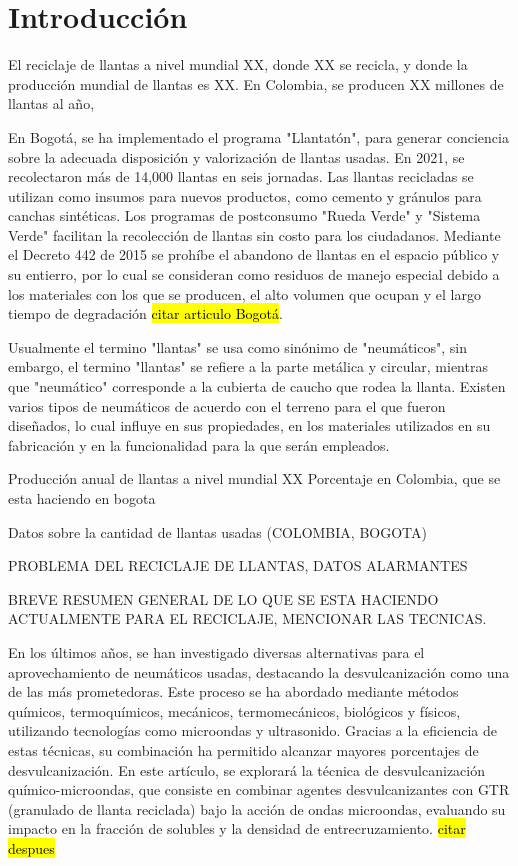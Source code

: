 \chapter{Introducción}


El reciclaje de llantas a nivel mundial XX, donde XX se recicla, y donde la producción mundial de llantas es XX. En Colombia, se producen XX millones de llantas al año, 

En Bogotá, se ha implementado el programa "Llantatón", para generar conciencia sobre la adecuada disposición y valorización de llantas usadas. En 2021, se recolectaron más de 14,000 llantas en seis jornadas. Las llantas recicladas se utilizan como insumos para nuevos productos, como cemento y gránulos para canchas sintéticas. Los programas de postconsumo "Rueda Verde" y "Sistema Verde" facilitan la recolección de llantas sin costo para los ciudadanos. Mediante el Decreto 442 de 2015 se prohíbe el abandono de llantas en el espacio público y su entierro, por lo cual se consideran como residuos de manejo especial debido a los materiales con los que se producen, el alto volumen que ocupan y el largo tiempo de degradación \hl{citar articulo Bogotá}.

Usualmente el termino "llantas" se usa como sinónimo de "neumáticos", sin embargo, el termino "llantas" se refiere a la parte metálica y circular, mientras que "neumático" corresponde a la cubierta de caucho que rodea la llanta. Existen varios tipos de neumáticos de acuerdo con el terreno para el que fueron diseñados, lo cual influye en sus propiedades, en los materiales utilizados en su fabricación y en la funcionalidad para la que serán empleados.

Producción anual de llantas a nivel mundial XX
Porcentaje en Colombia,
que se esta haciendo en bogota


Datos sobre la cantidad de llantas usadas (COLOMBIA, BOGOTA)

PROBLEMA DEL RECICLAJE DE LLANTAS, DATOS ALARMANTES

BREVE RESUMEN GENERAL DE LO QUE SE ESTA HACIENDO ACTUALMENTE PARA EL RECICLAJE, MENCIONAR LAS TECNICAS.

En los últimos años, se han investigado diversas alternativas para el aprovechamiento de neumáticos usadas, destacando la desvulcanización como una de las más prometedoras. Este proceso se ha abordado mediante métodos químicos, termoquímicos, mecánicos, termomecánicos, biológicos y físicos, utilizando tecnologías como microondas y ultrasonido. Gracias a la eficiencia de estas técnicas, su combinación ha permitido alcanzar mayores porcentajes de desvulcanización. En este artículo, se explorará la técnica de desvulcanización químico-microondas, que consiste en combinar agentes desvulcanizantes con GTR (granulado de llanta reciclada) bajo la acción de ondas microondas, evaluando su impacto en la fracción de solubles y la densidad de entrecruzamiento. \hl{citar despues}


